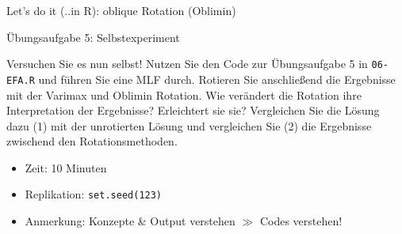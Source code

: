 \documentclass[
  ignorenonframetext,
]{beamer}
\newenvironment{Shaded}{\begin{snugshade}}{\end{snugshade}}
\newcommand{\AttributeTok}[1]{\textcolor[rgb]{0.77,0.63,0.00}{#1}}
\newcommand{\CommentTok}[1]{\textcolor[rgb]{0.56,0.35,0.01}{\textit{#1}}}
\newcommand{\DecValTok}[1]{\textcolor[rgb]{0.00,0.00,0.81}{#1}}
\newcommand{\FunctionTok}[1]{\textcolor[rgb]{0.00,0.00,0.00}{#1}}
\newcommand{\NormalTok}[1]{#1}
\newcommand{\OtherTok}[1]{\textcolor[rgb]{0.56,0.35,0.01}{#1}}
\newcommand{\SpecialCharTok}[1]{\textcolor[rgb]{0.00,0.00,0.00}{#1}}
\newcommand{\StringTok}[1]{\textcolor[rgb]{0.31,0.60,0.02}{#1}}
\providecommand{\tightlist}{%
  \setlength{\itemsep}{0pt}\setlength{\parskip}{0pt}}
\begin{document}
\begin{frame}[fragile]{Let's do it (..in R): oblique Rotation (Oblimin)}
\protect\hypertarget{lets-do-it-..in-r-oblique-rotation-oblimin}{}
\begin{Shaded}
\end{Shaded}
\end{frame}

\begin{frame}{Übungsaufgabe 5: Selbstexperiment}
\protect\hypertarget{uxfcbungsaufgabe-5-selbstexperiment}{}
\begin{example}
Versuchen Sie es nun selbst! Nutzen Sie den Code zur Übungsaufgabe 5 in
\texttt{06-EFA.R} und führen Sie eine MLF durch. Rotieren Sie anschließend die
Ergebnisse mit der Varimax und Oblimin Rotation. Wie verändert die Rotation ihre
Interpretation der Ergebnisse? Erleichtert sie sie? Vergleichen Sie die Lösung
dazu (1) mit der unrotierten Lösung und vergleichen Sie (2) die Ergebnisse
zwischend den Rotationsmethoden.
\end{example}

\begin{itemize}
\tightlist
\item
  Zeit: 10 Minuten
\item
  Replikation: \texttt{set.seed(123)}
\item
  Anmerkung: Konzepte \& Output verstehen \(\gg\) Codes verstehen!
\end{itemize}
\end{frame}
\end{document}
